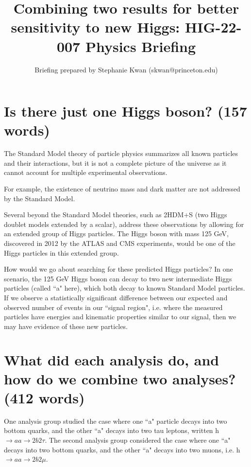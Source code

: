\documentclass{article}
\title{Combining two results for better sensitivity to new Higgs: HIG-22-007 Physics Briefing}
\author{Briefing prepared by Stephanie Kwan (skwan@princeton.edu)}
\begin{document}
\maketitle


\section{Is there just one Higgs boson? (157 words)}

The Standard Model theory of particle physics summarizes all known particles and their interactions, but it is not a complete picture of the universe as it cannot account for multiple experimental observations. 

For example, the existence of neutrino mass and dark matter are not addressed by the Standard Model. 

Several beyond the Standard Model theories, such as 2HDM+S (two Higgs doublet models extended by a scalar), address these observations by allowing for an extended group of Higgs particles. The Higgs boson with mass 125 GeV, 
discovered in 2012 by the ATLAS and CMS experiments, would be one of the Higgs particles in this extended group. 

How would we go about searching for these predicted Higgs particles? In one scenario, the 125 GeV Higgs boson can decay to two new intermediate Higgs particles (called ``a" here),
which both decay to known Standard Model particles. If we observe a statistically significant difference between our expected and observed number of events in our ``signal region", i.e. where the measured particles have 
energies and kinematic properties similar to our signal, then we may have evidence of these new particles. 


\section{What did each analysis do, and how do we combine two analyses? (412 words)}

One analysis group studied the case where one ``a" particle decays into two bottom quarks, and the other ``a" decays into two tau leptons, written h $\rightarrow aa \rightarrow 2b2\tau$.
The second analysis group considered the case where one ``a" decays into two bottom quarks, and the other ``a" decays into two muons, i.e. h $\rightarrow aa \rightarrow 2b2\mu$. 
\end{document}

